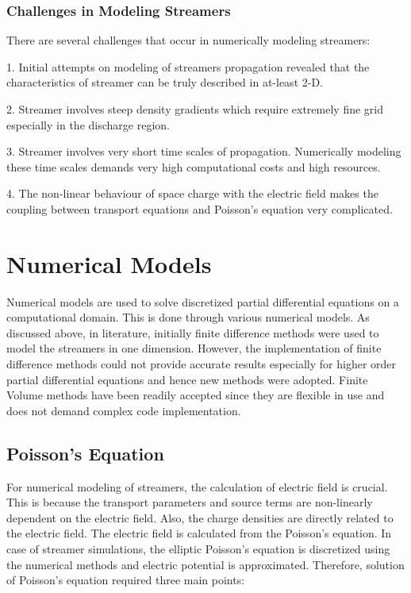 \documentclass{article}
\begin{document}
\subsubsection{Challenges in Modeling Streamers}

   There are several challenges that occur in numerically modeling streamers: 
   
   1. Initial attempts on modeling of streamers propagation revealed that the characteristics of streamer can be truly described in at-least 2-D. 
   
   2. Streamer involves steep density gradients which require extremely fine grid especially in the discharge region.
   
   3. Streamer involves very short time scales of propagation. Numerically modeling these time scales demands very high computational costs and high resources. 
   
   4. The non-linear behaviour of space charge with the electric field makes the coupling between transport equations and Poisson's equation very complicated.


\section{Numerical Models}
      Numerical models are used to solve discretized partial differential equations on a computational domain. This is done through various numerical models. As discussed above, in literature, initially finite difference methods were used to model the streamers in one dimension. However, the implementation of finite difference methods could not provide accurate results especially for higher order partial differential equations and hence new methods were adopted. Finite Volume methods have been readily accepted since they are flexible in use and does not demand complex code implementation.

\subsection{Poisson's Equation}

   For numerical modeling of streamers, the calculation of electric field is crucial. This is because the transport parameters and source terms are non-linearly dependent on the electric field. Also, the charge densities are directly related to the electric field. The electric field is calculated from the Poisson's equation. In case of streamer simulations, the elliptic Poisson's equation is discretized using the numerical methods and electric potential is approximated. Therefore, solution of Poisson's equation required three main points:
   
\end{document}
